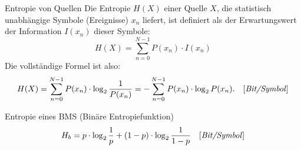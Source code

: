 \begin{definition}{Entropie von Quellen}
    Die Entropie $H(X)$ einer Quelle $X$, die statistisch unabhängige Symbole (Ereignisse) $x_n$ liefert, ist definiert als der Erwartungswert der Information $I(x_n)$ dieser Symbole: \[H(X) = \sum_{n=0}^{N-1} P(x_n) \cdot I(x_n)\]
    Die vollständige Formel ist also: \[H(X) = \sum_{n=0}^{N-1} P(x_n) \cdot \log_2 \frac{1}{P(x_n)} = -\sum_{n=0}^{N-1} P(x_n) \cdot \log_2 P(x_n). \quad \text{[\emph{Bit/Symbol}]}\]
\end{definition}

\begin{definition}{Entropie eines BMS (Binäre Entropiefunktion)}
    \[H_b = p \cdot \log_2 \frac{1}{p} + (1-p) \cdot \log_2 \frac{1}{1-p} \quad \text{[\emph{Bit/Symbol}]}\]
\end{definition}